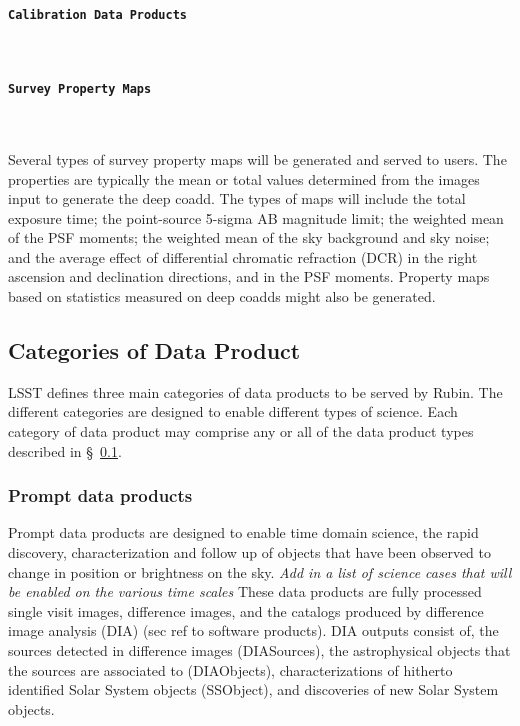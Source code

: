 \paragraph {\tt  Calibration Data Products} ~


\paragraph {\tt  Survey Property Maps}~

Several types of survey property maps will be generated and served to users. 
The properties are typically the mean or total values determined from the images input to generate the deep coadd. 
The types of maps will include the total exposure time; the point-source 5-sigma AB magnitude limit; the weighted mean of the PSF moments; the weighted mean of the sky background and sky noise; and the average effect of differential chromatic refraction (DCR) in the
right ascension and declination directions, and in the PSF moments. 
Property maps based on statistics measured on deep coadds might also be generated.



\subsection{Categories of Data Product} \label{sec:dp-categories}
LSST defines three main categories of data products to be served by Rubin.
The different categories are designed to enable different types of science.
Each category of data product may comprise any or all of the data product types described in \S~\ref{sec:dp-categories}.

\subsubsection{Prompt data products} \label{sec:dp-prompt}
Prompt data products are designed to enable time domain science, the rapid discovery, characterization and follow up of objects that have been observed to change in position or brightness on the sky.
{\it Add in a list of science cases that will be enabled on the various time scales}
These data products are fully processed single visit images, difference images, and the catalogs produced by difference image analysis (DIA)  (sec ref to software products).
DIA outputs consist of,  the sources detected in difference images (DIASources), the astrophysical objects that the sources are associated to (DIAObjects),
characterizations of hitherto identified Solar System objects (SSObject), and discoveries of new Solar System objects.

